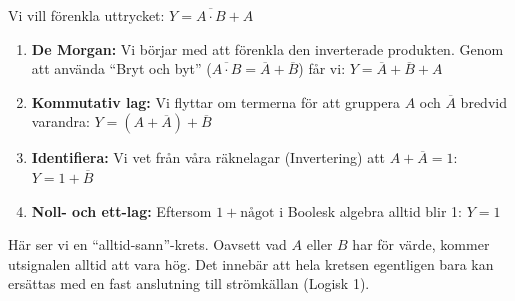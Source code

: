 \documentclass[
  swedish,
  letterpaper,
  oneside,
  openany]{book}
\begin{document}
\begin{tcolorbox}[enhanced jigsaw, arc=.35mm, bottomrule=.15mm, bottomtitle=1mm, breakable, colback=white, colbacktitle=quarto-callout-note-color!10!white, colframe=quarto-callout-note-color-frame, coltitle=black, left=2mm, leftrule=.75mm, opacityback=0, opacitybacktitle=0.6, rightrule=.15mm, title=\textcolor{quarto-callout-note-color}{\faInfo}\hspace{0.5em}{Exempel: Användning av De Morgan}, titlerule=0mm, toprule=.15mm, toptitle=1mm]

Vi vill förenkla uttrycket: \(Y = \overline{A \cdot B} + A\)

\begin{enumerate}
\def\labelenumi{\arabic{enumi}.}
\item
  \textbf{De Morgan:} Vi börjar med att förenkla den inverterade
  produkten. Genom att använda ``Bryt och byt''
  (\(\overline{A \cdot B} = \overline{A} + \overline{B}\)) får vi:
  \(Y = \overline{A} + \overline{B} + A\)
\item
  \textbf{Kommutativ lag:} Vi flyttar om termerna för att gruppera \(A\)
  och \(\overline{A}\) bredvid varandra:
  \(Y = (A + \overline{A}) + \overline{B}\)
\item
  \textbf{Identifiera:} Vi vet från våra räknelagar (Invertering) att
  \(A + \overline{A} = 1\): \(Y = 1 + \overline{B}\)
\item
  \textbf{Noll- och ett-lag:} Eftersom \(1 + \text{något}\) i Boolesk
  algebra alltid blir 1: \(Y = 1\)
\end{enumerate}

Här ser vi en ``alltid-sann''-krets. Oavsett vad \(A\) eller \(B\) har
för värde, kommer utsignalen alltid att vara hög. Det innebär att hela
kretsen egentligen bara kan ersättas med en fast anslutning till
strömkällan (Logisk 1).

\end{tcolorbox}
\end{document}

